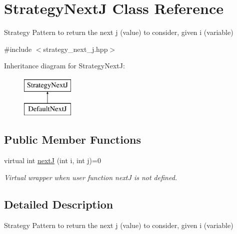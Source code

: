 \hypertarget{classStrategyNextJ}{\section{\-Strategy\-Next\-J \-Class \-Reference}
\label{classStrategyNextJ}
}


\-Strategy \-Pattern to return the next j (value) to consider, given i (variable)  




{\ttfamily \#include $<$strategy\-\_\-next\-\_\-j.\-hpp$>$}

\-Inheritance diagram for \-Strategy\-Next\-J\-:\begin{figure}[H]
\begin{center}
\leavevmode
\includegraphics[height=2.000000cm]{classStrategyNextJ}
\end{center}
\end{figure}
\subsection*{\-Public \-Member \-Functions}
\begin{DoxyCompactItemize}
\item 
virtual int \hyperlink{classStrategyNextJ_ab566c4e5827240b575d0e7445b7ba695}{next\-J} (int i, int j)=0
\begin{DoxyCompactList}\small\item\em \-Virtual wrapper when user function next\-J is not defined. \end{DoxyCompactList}\end{DoxyCompactItemize}


\subsection{\-Detailed \-Description}
\-Strategy \-Pattern to return the next j (value) to consider, given i (variable) 

